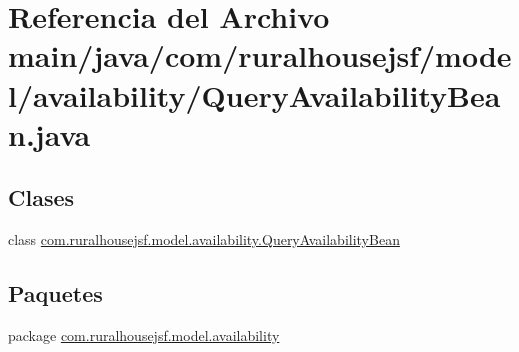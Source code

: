 \hypertarget{a00074}{}\section{Referencia del Archivo main/java/com/ruralhousejsf/model/availability/\+Query\+Availability\+Bean.java}
\label{a00074}
\subsection*{Clases}
\begin{DoxyCompactItemize}
\item 
class \mbox{\hyperlink{a00224}{com.\+ruralhousejsf.\+model.\+availability.\+Query\+Availability\+Bean}}
\end{DoxyCompactItemize}
\subsection*{Paquetes}
\begin{DoxyCompactItemize}
\item 
package \mbox{\hyperlink{a00120}{com.\+ruralhousejsf.\+model.\+availability}}
\end{DoxyCompactItemize}
